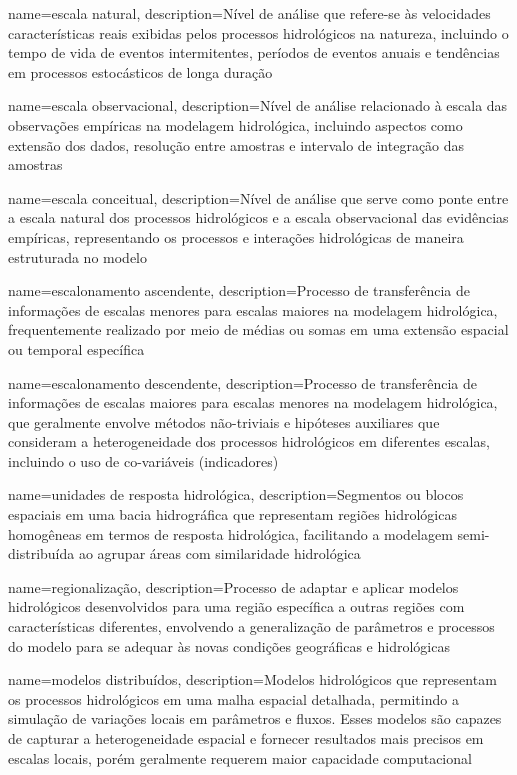{
    name=escala natural,
    description={Nível de análise que refere-se às velocidades características reais exibidas pelos processos hidrológicos na natureza, incluindo o tempo de vida de eventos intermitentes, períodos de eventos anuais e tendências em processos estocásticos de longa duração}
}

{
    name=escala observacional,
    description={Nível de análise relacionado à escala das observações empíricas na modelagem hidrológica, incluindo aspectos como extensão dos dados, resolução entre amostras e intervalo de integração das amostras}
}

{
    name=escala conceitual,
    description={Nível de análise que serve como ponte entre a escala natural dos processos hidrológicos e a escala observacional das evidências empíricas, representando os processos e interações hidrológicas de maneira estruturada no modelo}
}

{
    name=escalonamento ascendente,
    description={Processo de transferência de informações de escalas menores para escalas maiores na modelagem hidrológica, frequentemente realizado por meio de médias ou somas em uma extensão espacial ou temporal específica}
}

{
    name=escalonamento descendente,
    description={Processo de transferência de informações de escalas maiores para escalas menores na modelagem hidrológica, que geralmente envolve métodos não-triviais e hipóteses auxiliares que consideram a heterogeneidade dos processos hidrológicos em diferentes escalas, incluindo o uso de co-variáveis (indicadores)}
}

{
    name=unidades de resposta hidrológica,
    description={Segmentos ou blocos espaciais em uma bacia hidrográfica que representam regiões hidrológicas homogêneas em termos de resposta hidrológica, facilitando a modelagem semi-distribuída ao agrupar áreas com similaridade hidrológica}
}

{
    name=regionalização,
    description={Processo de adaptar e aplicar modelos hidrológicos desenvolvidos para uma região específica a outras regiões com características diferentes, envolvendo a generalização de parâmetros e processos do modelo para se adequar às novas condições geográficas e hidrológicas}
}

{
    name=modelos distribuídos,
    description={Modelos hidrológicos que representam os processos hidrológicos em uma malha espacial detalhada, permitindo a simulação de variações locais em parâmetros e fluxos. Esses modelos são capazes de capturar a heterogeneidade espacial e fornecer resultados mais precisos em escalas locais, porém geralmente requerem maior capacidade computacional}
}

